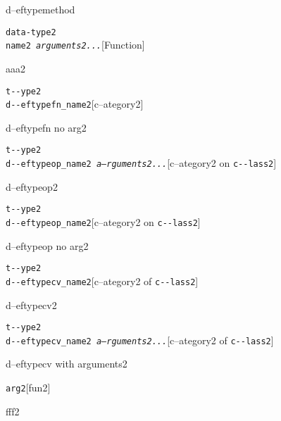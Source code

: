 \documentclass{book}
\begin{document}
\begin{titlepage}
%
d--eftypemethod


\noindent\texttt{data-type2\leavevmode{}\\name2 \bgroup{}\normalfont{}\textsl{arguments2...}\egroup{}}\hfill[Function]



%
aaa2

\noindent\texttt{t{-}{-}ype2\leavevmode{}\\d{-}{-}eftypefn\_name2}\hfill[c--ategory2]



%
d--eftypefn no arg2

\noindent\texttt{t{-}{-}ype2\leavevmode{}\\d{-}{-}eftypeop\_name2 \bgroup{}\normalfont{}\textsl{a--rguments2...}\egroup{}}\hfill[c--ategory2 on \texttt{c{-}{-}lass2}]



%
d--eftypeop2

\noindent\texttt{t{-}{-}ype2\leavevmode{}\\d{-}{-}eftypeop\_name2}\hfill[c--ategory2 on \texttt{c{-}{-}lass2}]



%
d--eftypeop no arg2

\noindent\texttt{t{-}{-}ype2\leavevmode{}\\d{-}{-}eftypecv\_name2}\hfill[c--ategory2 of \texttt{c{-}{-}lass2}]



%
d--eftypecv2

\noindent\texttt{t{-}{-}ype2\leavevmode{}\\d{-}{-}eftypecv\_name2 \bgroup{}\normalfont{}\textsl{a--rguments2...}\egroup{}}\hfill[c--ategory2 of \texttt{c{-}{-}lass2}]



%
d--eftypecv with arguments2

\noindent\texttt{arg2}\hfill[fun2]



%
fff2



\end{titlepage}
\end{document}
